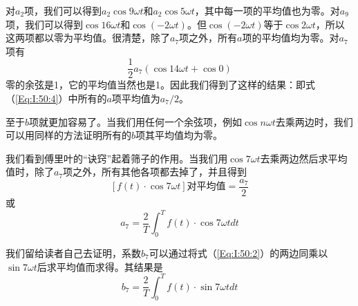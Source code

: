 对$a_2$项，我们可以得到$a_2 \cos 9\omega t$和$a_2 \cos 5 \omega t$，其中每一项的平均值也为零。对$a_9$项，我们可以得到$\cos 16\omega t$和$\cos(-2\omega t)$。但$\cos(-2\omega t)$等于$\cos2\omega t$，所以这两项都以零为平均值。很清楚，除了$a_7$项之外，所有$a$项的平均值均为零。对$a_7$项有
\begin{equation}
    \label{Eq:I:50:7}
    \frac{1}{2}a_7(\cos 14\omega t + \cos 0)
\end{equation}
零的余弦是1，它的平均值当然也是1。因此我们得到了这样的结果：即式（\ref{Eq:I:50:4}）中所有的$a$项平均值为$a_7/2$。

至于$b$项就更加容易了。当我们用任何一个余弦项，例如$\cos n\omega t$去乘两边时，我们可以用同样的方法证明所有的$b$项其平均值均为零。

我们看到傅里叶的“诀窍”起着筛子的作用。当我们用$\cos 7\omega t$去乘两边然后求平均值时，除了$a_7$项之外，所有其他各项都去掉了，并且得到
\begin{equation}
    \label{Eq:I:50:8}
    \left[f(t)\cdot\cos 7\omega t\right]\text{对平均值} = \frac{a_7}{2}
\end{equation}
或
\begin{equation}
    \label{Eq:I:50:9}
    a_7 = \frac{2}{T}\int_0^T f(t)\cdot\cos 7\omega t dt
\end{equation}

我们留给读者自己去证明，系数$b_7$可以通过将式（\ref{Eq:I:50:2}）的两边同乘以$\sin 7\omega t$后求平均值而求得。其结果是
\begin{equation}
    \label{Eq:I:50:10}
    b_7 = \frac{2}{T}\int_0^T f(t)\cdot\sin 7 \omega t dt
\end{equation}

